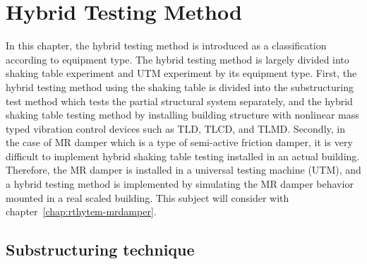 \chapter{Hybrid Testing Method}
\label{rthytem}
In this chapter, the hybrid testing method is introduced as a classification according to equipment type. The hybrid testing method is largely divided into shaking table experiment and UTM experiment by its equipment type. First, the hybrid testing method using the shaking table is divided into the substructuring test method which tests the partial structural system separately, and the hybrid shaking table testing method by installing building structure with nonlinear mass typed vibration control devices such as TLD, TLCD, and TLMD. Secondly, in the case of MR damper which is a type of semi-active friction damper, it is very difficult to implement hybrid shaking table testing installed in an actual building. Therefore, the MR damper is installed in a universal testing machine (UTM), and a hybrid testing method is implemented by simulating the MR damper behavior mounted in a real scaled building. This subject will consider with chapter~\ref{chap:rthytem-mrdamper}.

\section{Substructuring technique}
\label{chap:realtimesubstrct}

